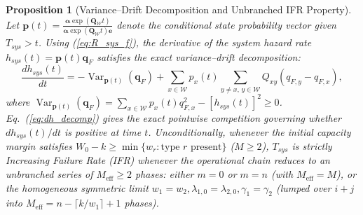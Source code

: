 \documentclass[10pt,a4paper]{article}
\newtheorem{proposition}{Proposition}
\begin{document}
\begin{proposition}[Variance--Drift Decomposition and Unbranched IFR Property]
Let $\mathbf{p}(t) = \frac{\boldsymbol{\alpha} \exp(\mathbf{Q}_{\mathcal{W}} t)}{\boldsymbol{\alpha} \exp(\mathbf{Q}_{\mathcal{W}} t) \mathbf{e}}$ denote the conditional state probability vector given $T_{sys} > t$. Using (\ref{eq:R_sys_f}), the derivative of the system hazard rate $h_{sys}(t) = \mathbf{p}(t)\mathbf{q}_F$ satisfies the exact variance--drift decomposition:
\begin{equation}
\frac{d h_{sys}(t)}{dt} = -\operatorname{Var}_{\mathbf{p}(t)}(\mathbf{q}_F) + \sum_{x \in \mathcal{W}} p_x(t) \sum_{y \neq x, \, y \in \mathcal{W}} Q_{xy} \left(q_{F,y} - q_{F,x}\right),
\label{eq:dh_decomp}
\end{equation}
where $\operatorname{Var}_{\mathbf{p}(t)}(\mathbf{q}_F) = \sum_{x \in \mathcal{W}} p_x(t) q_{F,x}^2 - [h_{sys}(t)]^2 \ge 0$. Eq.~(\ref{eq:dh_decomp}) gives the exact pointwise competition governing whether $dh_{sys}(t)/dt$ is positive at time $t$. Unconditionally, whenever the initial capacity margin satisfies $W_0 - k \ge \min\{w_r : \text{type } r \text{ present}\}$ ($M \ge 2$), $T_{sys}$ is strictly Increasing Failure Rate (IFR) whenever the operational chain reduces to an unbranched series of $M_{\mathrm{eff}} \ge 2$ phases: either $m=0$ or $m=n$ (with $M_{\mathrm{eff}} = M$), or the homogeneous symmetric limit $w_1=w_2, \lambda_{1,0}=\lambda_{2,0}, \gamma_1=\gamma_2$ (lumped over $i+j$ into $M_{\mathrm{eff}} = n - \lceil k/w_1 \rceil + 1$ phases).
\end{proposition}
\end{document}
